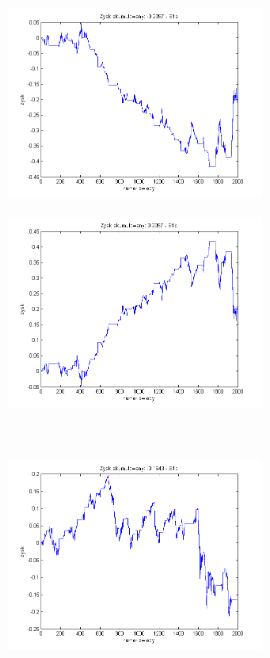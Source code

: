 \documentclass{tewiart}
\begin{document}
\FloatBarrier
\begin{figure}[h]
\centering
\begin{minipage}{\linewidth}
\centering
\includegraphics[width=0.6\textwidth]{images/fcopperS1a.png}
\label{jedno}
\end{minipage}
\begin{minipage}{\linewidth}
\centering
\includegraphics[width=0.6\textwidth]{images/fcopperS1b.png}
\label{dwu}
\end{minipage}
\\
\begin{minipage}{\linewidth}
\centering
\includegraphics[width=0.6\textwidth]{images/fcopperS1c.png}
\label{cztero}
\end{minipage}

\end{figure}
\end{document}
